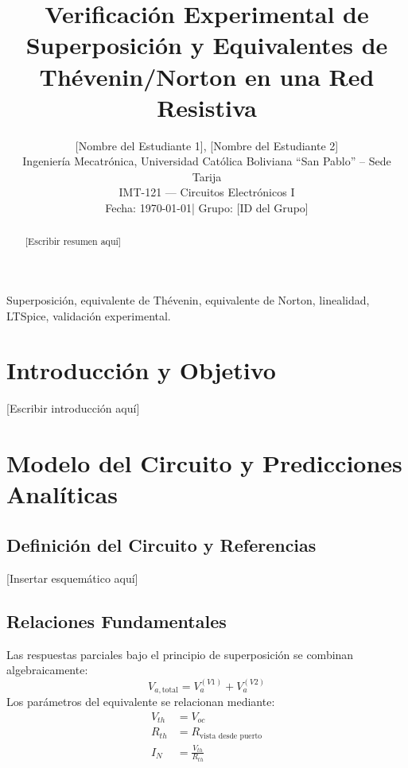 \documentclass[journal, a4paper]{IEEEtran}
\begin{document}
\title{Verificación Experimental de Superposición y Equivalentes de Thévenin/Norton en una Red Resistiva}

\author{
    [Nombre del Estudiante 1], [Nombre del Estudiante 2]\\
    Ingeniería Mecatrónica, Universidad Católica Boliviana ``San Pablo'' -- Sede Tarija\\
    IMT-121 --- Circuitos Electrónicos I\\
    Fecha: \today \quad | \quad Grupo: [ID del Grupo]
}

\maketitle

\begin{abstract}
[Escribir resumen aquí]
\end{abstract}

\begin{IEEEkeywords}
Superposición, equivalente de Thévenin, equivalente de Norton, linealidad, LTSpice, validación experimental.
\end{IEEEkeywords}

\section{Introducción y Objetivo}
[Escribir introducción aquí]

\section{Modelo del Circuito y Predicciones Analíticas}

\subsection{Definición del Circuito y Referencias}
[Insertar esquemático aquí]

\subsection{Relaciones Fundamentales}
Las respuestas parciales bajo el principio de superposición se combinan algebraicamente:
\begin{equation}
    V_{a,\text{total}} = V_{a}^{(V1)} + V_{a}^{(V2)}
\end{equation}
Los parámetros del equivalente se relacionan mediante:
\begin{align}
    V_{th} &= V_{oc} \\
    R_{th} &= R_{\text{vista desde puerto}} \\
    I_{N} &= \frac{V_{th}}{R_{th}}
\end{align}
\end{document}
